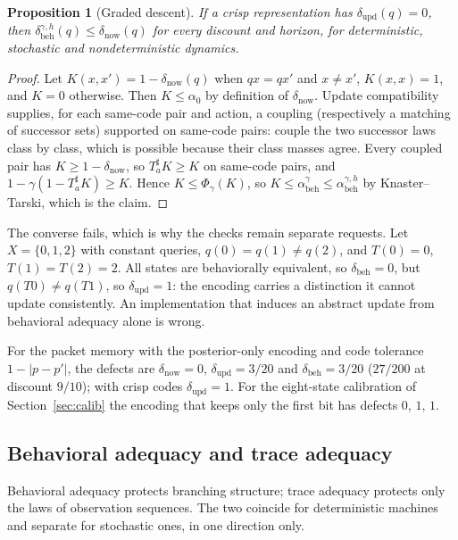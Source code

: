 \documentclass[11pt]{article}
\newcommand{\lift}{^{\sharp}}
\newcommand{\dnow}{\delta_{\mathrm{now}}}
\newcommand{\dupd}{\delta_{\mathrm{upd}}}
\newcommand{\dbd}{\delta_{\mathrm{beh}}}
\newcommand{\abeh}{\alpha_{\mathrm{beh}}}
\theoremstyle{definition}
\theoremstyle{plain}
\newtheorem{proposition}[definition]{Proposition}
\begin{document}
\begin{proposition}[Graded descent]\label{prop:gradeddescent}
If a crisp representation has $\dupd(q)=0$, then $\dbd^{\gamma,h}(q)\le\dnow(q)$ for every
discount and horizon, for deterministic, stochastic and nondeterministic dynamics.
\end{proposition}

\begin{proof}
Let $K(x,x')=1-\dnow(q)$ when $qx=qx'$ and $x\neq x'$, $K(x,x)=1$, and $K=0$ otherwise. Then
$K\le\alpha_0$ by definition of $\dnow$. Update compatibility supplies, for each same-code pair
and action, a coupling (respectively a matching of successor sets) supported on same-code pairs:
couple the two successor laws class by class, which is possible because their class masses agree.
Every coupled pair has $K\ge1-\dnow$, so $T_a\lift K\ge K$ on same-code pairs, and
$1-\gamma(1-T_a\lift K)\ge K$. Hence $K\le\Phi_\gamma(K)$, so $K\le\abeh^\gamma\le\abeh^{\gamma,h}$
by Knaster--Tarski, which is the claim.
\end{proof}

The converse fails, which is why the checks remain separate requests. Let $X=\{0,1,2\}$ with
constant queries, $q(0)=q(1)\ne q(2)$, and $T(0)=0$, $T(1)=T(2)=2$. All states are behaviorally
equivalent, so $\dbd=0$, but $q(T0)\ne q(T1)$, so $\dupd=1$: the encoding carries a distinction it
cannot update consistently. An implementation that induces an abstract update from behavioral
adequacy alone is wrong.

For the packet memory with the posterior-only encoding and code tolerance $1-|p-p'|$, the
defects are $\dnow=0$, $\dupd=3/20$ and $\dbd=3/20$ ($27/200$ at discount $9/10$); with crisp
codes $\dupd=1$. For the eight-state calibration of Section~\ref{sec:calib} the encoding that
keeps only the first bit has defects $0$, $1$, $1$.

\subsection{Behavioral adequacy and trace adequacy}\label{sec:behtrace}

Behavioral adequacy protects branching structure; trace adequacy protects only the laws of
observation sequences. The two coincide for deterministic machines and separate for stochastic
ones, in one direction only.
\end{document}
